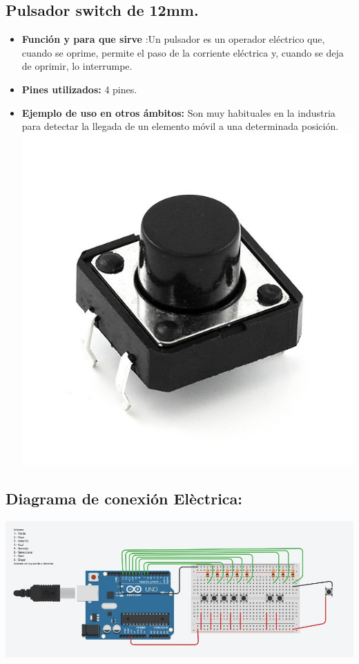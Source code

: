\documentclass[12pt]{article}
\begin{document}
    \subsection{Pulsador switch de 12mm.}
    \begin{itemize}
         \item \textbf{Función y para que sirve }:Un pulsador es un operador eléctrico que, cuando se oprime, permite el paso de la corriente eléctrica y, cuando se deja de oprimir, lo interrumpe.
         \item \textbf{Pines utilizados: }4 pines.
         \item\textbf{Ejemplo de uso en otros ámbitos: }Son muy habituales en la industria para detectar la llegada de un elemento móvil a una determinada posición.
         \newline
         \includegraphics[scale =0.3]{switch.png}\\[1.0 cm]
    \end{itemize}{}
        \newpage
         \subsection{Diagrama de conexión Elèctrica:}
         \includegraphics[scale =0.7]{diagrama.png}\\[0.2 cm]
         \newpage
\end{document}
